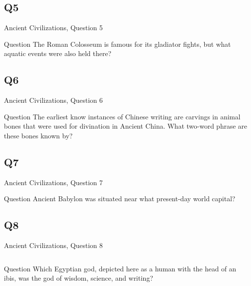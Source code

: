 \documentclass[11pt]{beamer}
\begin{document}
\subsection*{Q5}
\begin{frame}[t]{Ancient Civilizations, Question 5}
\begin{block}{Question}
The Roman Colosseum is famous for its gladiator fights, but what aquatic events were also held there?
\end{block}
\end{frame}
\subsection*{Q6}
\begin{frame}[t]{Ancient Civilizations, Question 6}
\begin{block}{Question}
The earliest know instances of Chinese writing are carvings in animal bones that were used for divination in Ancient China. What two-word phrase are these bones known by?
\end{block}
\end{frame}
\subsection*{Q7}
\begin{frame}[t]{Ancient Civilizations, Question 7}
\begin{block}{Question}
Ancient Babylon was situated near what present-day world capital?
\end{block}
\end{frame}
\subsection*{Q8}
\begin{frame}[t]{Ancient Civilizations, Question 8}
\begin{columns}[T,totalwidth=\linewidth]
\begin{column}{0.32\linewidth}
\begin{block}{Question}
Which Egyptian god, depicted here as a human with the head of an ibis, was the god of wisdom, science, and writing?
\end{block}
\end{column}
\begin{column}{0.65\linewidth}
\begin{center}
\texttt{[image: \{Images/thoth]}.png}
\end{center}
\end{column}
\end{columns}
\end{frame}
\end{document}
